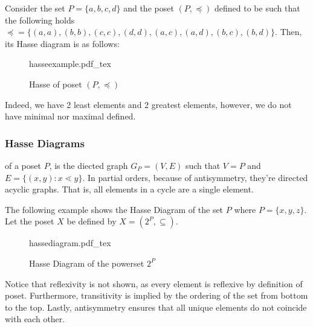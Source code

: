 \documentclass[a4paper]{article}
\newcommand{\incfig}[2][1]{%
	\def\svgwidth{#1\columnwidth}
	{#2.pdf_tex}
}
\theoremstyle{plain}
\theoremstyle{definition}
\newtheorem{defn}{Definition}[section]
\newtheorem{exmp}{Example}[section]
\theoremstyle{remark}
\begin{document}
\begin{tcolorbox}[colback=black!3!white,colframe=black!60!white,title=\begin{exmp}Partial Order Element Distinction \label{Partial Order Element Distinction}\end{exmp}]
Consider the set $P = \{a,b,c,d\}$ and the poset $(P, \preceq)$ defined to be such that the following holds $\preceq = \{(a,a),(b,b),(c,c),(d,d),(a,c),(a,d),(b,c),(b,d)\}$. Then, its Hasse diagram is as follows:
\begin{figure}[H]
    \centering
    \incfig{hasseexample}
    \caption{Hasse of poset $(P,\preceq)$}
    \label{fig:hasseexample}
\end{figure}
Indeed, we have 2 least elements and 2 greatest elements, however, we do not have minimal nor maximal defined.
\end{tcolorbox}
\subsubsection{Hasse Diagrams}
\begin{tcolorbox}[colback=black!3!white,colframe=black!60!white,title=\begin{defn}Hasse Diagram \label{Hasse Diagram}\end{defn}]
of a poset $P$, is the diected graph $G_{P} = (V,E)$ such that $V = P$ and $E = \{ (x,y) : x \lessdot y \}$. In partial orders, because of antisymmetry, they're directed acyclic graphs. That is, all elements in a cycle are a single element.
\end{tcolorbox}
\begin{tcolorbox}[colback=black!3!white,colframe=black!60!white,title=\begin{exmp}Hasse Diagram Example \label{Hasse Diagram Example}\end{exmp}]
The following example shows the Hasse Diagram of the set $ P$ where $P = \{x,y,z\}$. Let the poset $X$ be defined by $X = (2^{P}, \subseteq)$.

\begin{figure}[H]
    \centering
    \incfig{hassediagram}
    \caption{Hasse Diagram of the powerset $2^{P}$}
    \label{fig:hasse}
\end{figure}
Notice that reflexivity is not shown, as every element is reflexive by definition of poset. Furthermore, transitivity is implied by the ordering of the set from bottom to the top. Lastly, antisymmetry ensures that all unique elements do not coincide with each other.
\end{tcolorbox}
\end{document}
